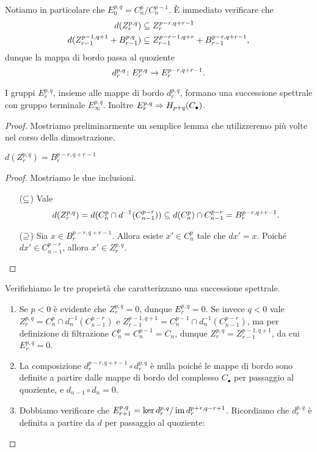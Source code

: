 Notiamo in particolare che $E^{p,q}_0=C^p_n/C^{p-1}_n$. È immediato verificare che
\begin{align*}
d(Z^{p,q}_r)&\subseteq Z^{p-r,q+r-1}_r\\
d(Z^{p-1,q+1}_{r-1}+B^{p,q}_{r-1})&\subseteq Z^{p-r-1,q+r}_{r-1}+B^{p-r,q+r-1}_{r-1},
\end{align*}
dunque la mappa di bordo passa al quoziente
$$
d^{p,q}_r\colon E^{p,q}_r\to E^{p-r,q+r-1}_r.
$$
\begin{proposition}
I gruppi $E^{p,q}_r$, insieme alle mappe di bordo $d^{p,q}_r$, formano una successione spettrale con gruppo terminale $E^{p,q}_\infty$. Inoltre $E^{p,q}_r\Rightarrow H_{p+q}(C_\bullet)$.
\end{proposition}
\begin{proof}
Mostriamo preliminarmente un semplice lemma che utilizzeremo più volte nel corso della dimostrazione.
\begin{lemma*}
$d(Z^{p,q}_r)=B^{p-r,q+r-1}_r$
\end{lemma*}
\begin{proof}
Mostriamo le due inclusioni.
\begin{itemize}
\item[($\subseteq$)] Vale
$$
d(Z^{p,q}_r)=d(C^p_n\cap d^{-1}(C^{p-r}_{n-1}))\subseteq d(C^p_n)\cap C^{p-r}_{n-1}=B^{p-r,q+r-1}_r.
$$
\item[($\supseteq$)] Sia $x\in B^{p-r,q+r-1}_r$. Allora esiste $x'\in C^p_n$ tale che $dx'=x$. Poiché $dx'\in C^{p-r}_{n-1}$, allora $x'\in Z^{p,q}_r$.
\end{itemize}
\end{proof}
Verifichiamo le tre proprietà che caratterizzano una successione spettrale.
\begin{enumerate}
\item Se $p<0$ è evidente che $Z^{p,q}_r=0$, dunque $E^{p,q}_r=0$. Se invece $q<0$ vale $Z^{p,q}_r=C^p_n\cap d_n^{-1}(C^{p-r}_{n-1})$ e $Z^{p-1,q+1}_{r-1}=C^{p-1}_n\cap d_n^{-1}(C^{p-r}_{n-1})$, ma per definizione di filtrazione $C^p_n=C^{p-1}_n=C_n$, dunque $Z^{p,q}_r=Z^{p-1,q+1}_{r-1}$, da cui $E^{p,q}_r=0$.
\item La composizione $d^{p-r,q+r-1}_r\circ d^{p,q}_r$ è nulla poiché le mappe di bordo sono definite a partire dalle mappe di bordo del complesso $C_\bullet$ per passaggio al quoziente, e $d_{n-1}\circ d_n=0$.
\item Dobbiamo verificare che $E^{p,q}_{r+1}=\ker d^{p,q}_r/\operatorname{im} d^{p+r,q-r+1}_r$. Ricordiamo che $d^{p,q}_r$ è definita a partire da $d$ per passaggio al quoziente:

\end{enumerate}
\end{proof}
